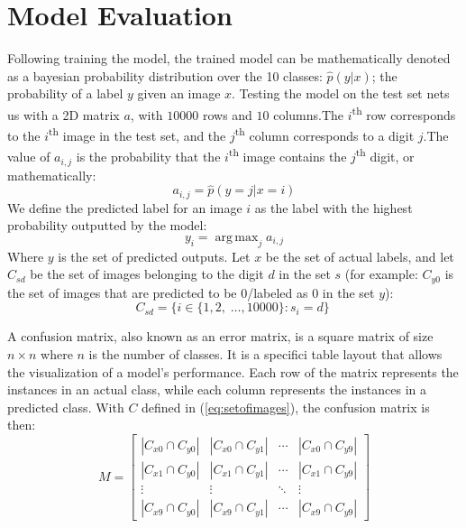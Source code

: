 \documentclass[conference]{IEEEtran}
\DeclareMathOperator*{\argmax}{arg\,max}
\begin{document}
\section{Model Evaluation}\label{sec:test}
Following training the model, the trained model can be mathematically denoted as a bayesian probability distribution over the 10 classes: $\hat{p}(y | x)$; the probability of a label $y$ given an image $x$.
Testing the model on the test set nets us with a 2D matrix $a$, with $10000$ rows and $10$ columns.\@ The $i$\textsuperscript{th} row corresponds to the $i$\textsuperscript{th} image in the test set, and the $j$\textsuperscript{th} column corresponds to a digit $j$.\@ The value of $a_{i,j}$ is the probability that the $i$\textsuperscript{th} image contains the $j$\textsuperscript{th} digit, or mathematically:
\begin{equation}
    a_{i,j} = \hat{p}(y = j | x = i)
\end{equation}
We define the predicted label for an image $i$ as the label with the highest probability outputted by the model:
\begin{equation}
    y_i = \argmax_j a_{i,j}
\end{equation}
Where $y$ is the set of predicted outputs. Let $x$ be the set of actual labels, and let $C_{sd}$ be the set of images belonging to the digit $d$ in the set $s$ (for example: $C_{y0}$ is the set of images that are predicted to be 0/labeled as 0 in the set $y$):
\begin{equation}
    C_{sd} = \{i \in \{1, 2, \;\ldots, 10000\} : s_i = d\}
    \;\label{eq:setofimages}
\end{equation}
\par A confusion matrix, also known as an error matrix, is a square matrix of size $n \times n$ where $n$ is the number of classes. It is a specifici table layout that allows the visualization of a model's performance. Each row of the matrix represents the instances in an actual class, while each column represents the instances in a predicted class\cite{Stehman1997}. With $C$ defined in (\ref{eq:setofimages}), the confusion matrix is then:
\begin{equation}
    M = \begin{bmatrix}
        |C_{x0} \cap C_{y0}| & |C_{x0} \cap C_{y1}| & \cdots & |C_{x0} \cap C_{y9}| \\
        |C_{x1} \cap C_{y0}| & |C_{x1} \cap C_{y1}| & \cdots & |C_{x1} \cap C_{y9}| \\
        \vdots & \vdots & \ddots & \vdots \\
        |C_{x9} \cap C_{y0}| & |C_{x9} \cap C_{y1}| & \cdots & |C_{x9} \cap C_{y9}|
    \end{bmatrix}
\end{equation}
\end{document}
